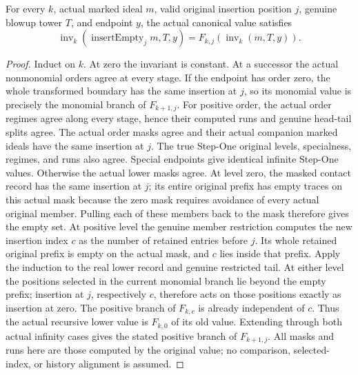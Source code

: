\begin{theorem}
\label{hir:original-invariant-empty-actual}
\leanok
{}
For every $k$, actual marked ideal $m$, valid original insertion position $j$,
genuine blowup tower $T$, and endpoint $y$, the actual canonical value satisfies
\[
 \operatorname{inv}_{k}(\operatorname{insertEmpty}_{j}m,T,y)
 =F_{k,j}(\operatorname{inv}_{k}(m,T,y)).
\]
\end{theorem}
\begin{proof}
Induct on $k$. At zero the invariant is constant. At a successor the actual
nonmonomial orders agree at every stage. If the endpoint has order zero, the
whole transformed boundary has the same insertion at $j$, so its monomial
value is precisely the monomial branch of $F_{k+1,j}$.
For positive order, the actual order regimes agree along every stage, hence
their computed runs and genuine head-tail splits agree. The actual order
masks agree and their actual companion marked ideals have the same insertion
at $j$. The true Step-One original levels, specialness, regimes, and runs
also agree. Special endpoints give identical infinite Step-One values.
Otherwise the actual lower masks agree. At level zero, the masked contact
record has the same insertion at $j$; its entire original prefix has empty
traces on this actual mask because the zero mask requires avoidance of every
actual original member. Pulling each of these members back to the mask
therefore gives the empty set. At positive level the genuine member restriction
computes the new insertion index $c$ as the number of retained entries before
$j$. Its whole retained original prefix is empty on the actual mask, and
$c$ lies inside that prefix. Apply the induction to the real lower record
and genuine restricted tail. At either level the positions selected in the current monomial branch
lie beyond the empty prefix; insertion at $j$, respectively $c$, therefore
acts on those positions exactly as insertion at zero. The
positive branch of $F_{k,c}$ is already independent of $c$. Thus the actual
recursive lower value is $F_{k,0}$ of its old value. Extending through both
actual infinity cases gives the stated positive branch of $F_{k+1,j}$.
All masks and runs here are those computed by the original value; no
comparison, selected-index, or history alignment is assumed.
\end{proof}


